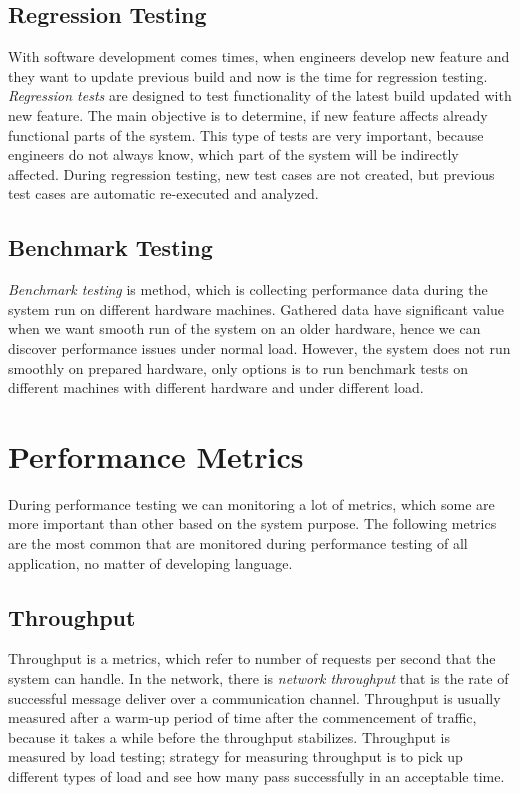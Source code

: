 \subsection*{Regression Testing}
With software development comes times, when engineers develop new feature and they want to update previous build and now is the time for regression testing. \emph{Regression tests} \cite{STF:REGRESSION} are designed to test functionality of the latest build updated with new feature. The main objective is to determine, if new feature affects already functional parts of the system. This type of tests are very important, because engineers do not always know, which part of the system will be indirectly affected. During regression testing, new test cases are not created, but previous test cases are automatic re-executed and analyzed. 


\subsection*{Benchmark Testing}
\emph{Benchmark testing} \cite{Aho:Benchmarking} is method, which is collecting performance data during the system run on different hardware machines. Gathered data have significant value when we want smooth run of the system on an older hardware, hence we can discover performance issues under normal load. However, the system does not run smoothly on prepared hardware, only options is to run benchmark tests on different machines with different hardware and under different load.  

\section{Performance Metrics}
\label{Performance Metrics}

During performance testing we can monitoring a lot of metrics, which some are more important than other based on the system purpose. The following metrics are the most common that are monitored during performance testing of all application, no matter of developing language. 


\subsection{Throughput}
Throughput is a metrics, which refer to number of requests per second that the system can handle. In the network, there is \emph{network throughput} that is the rate of successful message deliver over a communication channel. Throughput is usually measured after a warm-up period of time after the commencement of traffic, because it takes a while before the throughput stabilizes. Throughput is measured by load testing; strategy for measuring throughput is to pick up different types of load and see how many pass successfully in an acceptable time. 

